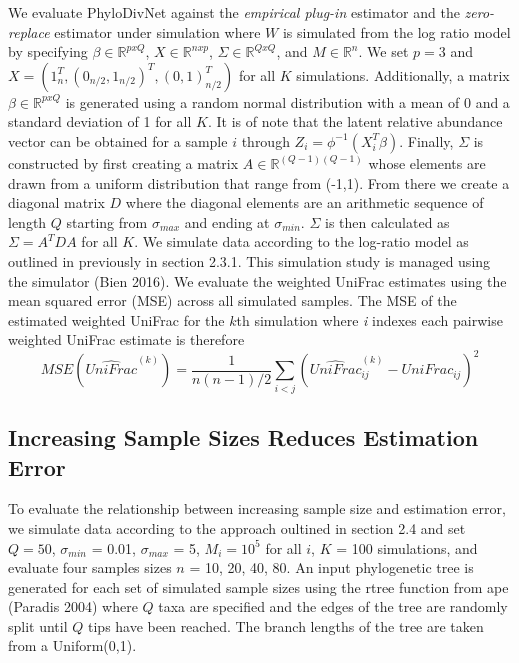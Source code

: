 \documentclass{article}
\newcommand*{\myfont}{\fontfamily{lmtt}\selectfont}
\begin{document}
We evaluate {\myfont PhyloDivNet} against the \textit{empirical plug-in} estimator and the \textit{zero-replace} estimator under simulation where $W$ is simulated from the log ratio model by specifying $\beta \in \mathbb{R}^{pxQ}$, $X \in \mathbb{R}^{nxp}$, $\Sigma \in \mathbb{R}^{QxQ}$, and $M \in \mathbb{R}^{n}$. We set $p=3$ and $X =(1_n^{T}, (0_{n/2},1_{n/2})^{T},(0,1)_{n/2}^{T})$ for all $K$ simulations. Additionally, a matrix $\beta \in \mathbb{R}^{pxQ}$ is generated using a random normal distribution with a mean of 0 and a standard deviation of 1 for all $K$. It is of note that the latent relative abundance vector can be obtained for a sample $i$ through $Z_i = \phi^{-1}(X_i^T \beta)$. Finally, $\Sigma$ is constructed by first creating a matrix $A \in \mathbb{R}^{(Q-1)(Q-1)}$ whose elements are drawn from a uniform distribution that range from (-1,1). From there we create a diagonal matrix $D$ where the diagonal elements are an arithmetic sequence of length $Q$ starting from $\sigma_{max}$ and ending at $\sigma_{min}$. $\Sigma$ is then calculated as $\Sigma = A^{T}DA$ for all $K$. We simulate data according to the log-ratio model as outlined in previously in section 2.3.1. This simulation study is managed using the {\myfont simulator} (Bien 2016). We evaluate the weighted UniFrac estimates using the mean squared error (MSE) across all simulated samples. The MSE of the estimated weighted UniFrac for the $k$th simulation where \textit{i} indexes each pairwise weighted UniFrac estimate is therefore
\begin{equation}
    MSE(\widehat{UniFrac}^{(k)})= \frac{1}{n(n-1)/2}\sum_{i<j}(\widehat{UniFrac}_{ij}^{(k)}-UniFrac_{ij})^2
\end{equation}

\subsection{Increasing Sample Sizes Reduces Estimation Error}
To evaluate the relationship between increasing sample size and estimation error, we simulate data according to the approach oultined in section 2.4 and set $Q = 50$, $\sigma_{min}$ = 0.01, $\sigma_{max}$ = 5, $M_{i} = 10^5$ for all $i$, $K$ = 100 simulations, and evaluate four samples sizes $n$ = 10, 20, 40, 80. An input phylogenetic tree is generated for each set of simulated sample sizes using the {\myfont rtree} function from {\myfont ape} (Paradis 2004) where $Q$ taxa are specified and the edges of the tree are randomly split until $Q$ tips have been reached. The branch lengths of the tree are taken from a Uniform(0,1).
\end{document}
